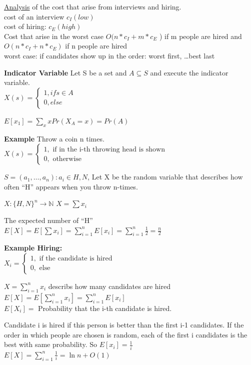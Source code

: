 \underline{Analysis} of the cost that arise from interviews and hiring.\\
cost of an interview $c{_I}(low)$\\
cost of hiring: $c{_E}(high)$\\
Cost that arise in the worst case $O(n* c{_I} +  m * c{_E}$ ) if m people are hired 
and \\
$O(n * c{_I} +  n *  c{_E} )$ if n people are hired \\
worst case: if candidates show up in the order: worst first, \ldots best last


\textbf{Indicator Variable}
Let S be a set and $A \subseteq S$ and execute the indicator variable.\\

$ X(s)=\left\{\begin{array}{cl} 1, if s\in A \\ 0, else \end{array}\right .$

$E[x{_1}] = \sum\limits_{x} x Pr(X{_A}=x) = Pr(A)$

\textbf{Example}
Throw a coin n times.
$ X(s)=\left\{\begin{array}{cl} 1, \mbox{ if in the i-th throwing head is shown} \\ 0, \mbox{  otherwise } \end{array}\right .$

$S = {(a{_1},\ldots,a{_n}) : a{_i} \in {H,N}}$,
Let X be the random variable that describes how often ``H'' appears when you throw n-times.

$X:\{H,N\}^n \rightarrow \mathbb{N}$
$X=\sum x{_i}$

The expected number of ``H''\\

$E[X] = E[\sum x{_i}] = \sum\limits_{i=1}^n E[x{_i}] = \sum\limits_{i=1}^n \frac{1}{2} = \frac{n}{2}$

\textbf{Example Hiring:}\\

$ X{_i} = \left\{\begin{array}{cl} 1, \mbox{ if the candidate is hired} \\ 0, \mbox{  else } \end{array}\right .$

$X= \sum\limits_{i=1}^n x{_i}$ describs how many candidates are hired\\

$E[X] =  E[\sum\limits_{i=1}^n x{_i}] = \sum\limits_{i=1}^n E[x{_i}]$\\

$E[X{_i}] = $ Probability that the i-th candidate is hired.


Candidate i is hired if this person is better than the first i-1 candidates. If the order in which people are chosen is random, each of the first i candidates is the best with same probability.
So $E[x{_i}] =\frac{1}{i}$\\
$E[X] =  \sum\limits_{i=1}^n \frac{1}{i} = \ln n + O(1)$ 






